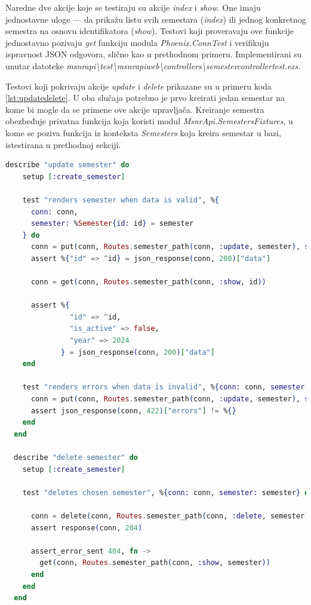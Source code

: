 \documentclass[12pt,oneside]{memoir}
\begin{document}
\par Naredne dve akcije koje se testiraju su akcije \emph{index} i \emph{show}. One imaju jednostavne uloge --- da prikažu listu svih semestara (\emph{index}) ili jednog konkretnog semestra na osnovu identifikatora (\emph{show}). Testovi koji proveravaju ove funkcije jednostavno pozivaju \emph{get} funkciju modula \emph{Phoenix.ConnTest} i verifikuju ispravnost JSON odgovora, slično kao u prethodnom primeru. Implementirani su unutar datoteke \emph{msnr{\textunderscore}api{\textbackslash}test{\textbackslash}msnr{\textunderscore}api{\textunderscore}web{\textbackslash}controllers{\textbackslash}semester{\textunderscore}controller{\textunderscore}test.exs.}

\par Testovi koji pokrivaju akcije \emph{update} i \emph{delete} prikazane su u primeru koda \ref{lst:updatedelete}. U oba slučaja potrebno je prvo kreirati jedan semestar na kome bi  mogle da se primene ove akcije upravljača. Kreiranje semestra obezbeđuje privatna funkcija koja koristi modul \emph{MsnrApi.SemestersFixtures}, u kome se poziva funkcija iz konteksta \emph{Semesters} koja kreira semestar u bazi, istestirana u prethodnoj sekciji.

\begin{lstlisting}[language=elixir, caption={Testiranje akcije \emph{update} i \emph{delete} upravljača \emph{SemesterController}},captionpos=b, label={lst:updatedelete}]
describe "update semester" do
    setup [:create_semester]

    test "renders semester when data is valid", %{
      conn: conn,
      semester: %Semester{id: id} = semester
    } do
      conn = put(conn, Routes.semester_path(conn, :update, semester), semester: @update_attrs)
      assert %{"id" => ^id} = json_response(conn, 200)["data"]

      conn = get(conn, Routes.semester_path(conn, :show, id))

      assert %{
               "id" => ^id,
               "is_active" => false,
               "year" => 2024
             } = json_response(conn, 200)["data"]
    end

    test "renders errors when data is invalid", %{conn: conn, semester: semester} do
      conn = put(conn, Routes.semester_path(conn, :update, semester), semester: @invalid_attrs)
      assert json_response(conn, 422)["errors"] != %{}
    end
  end

  describe "delete semester" do
    setup [:create_semester]

    test "deletes chosen semester", %{conn: conn, semester: semester} do

      conn = delete(conn, Routes.semester_path(conn, :delete, semester))
      assert response(conn, 204)

      assert_error_sent 404, fn ->
        get(conn, Routes.semester_path(conn, :show, semester))
      end
    end
  end
\end{lstlisting}
\end{document}

